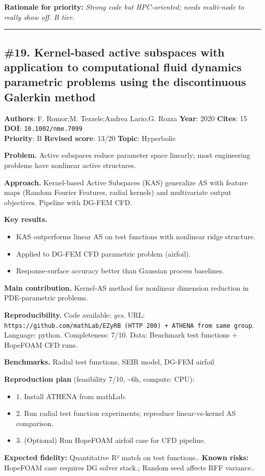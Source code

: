 \documentclass[10pt,letterpaper]{article}
\begin{document}
\textbf{Rationale for priority:} \emph{Strong code but HPC-oriented; needs multi-node to really show off. B tier.}

\medskip\hrule\medskip

\subsection*{\#19. Kernel‐based active subspaces with application to computational fluid dynamics parametric problems using the discontinuous Galerkin method}
\textbf{Authors}: F. Romor;M. Tezzele;Andrea Lario;G. Rozza \textbullet{} \textbf{Year}: 2020 \textbullet{} \textbf{Cites}: 15 \textbullet{} \textbf{DOI}: \texttt{10.1002/nme.7099} \\
\textbf{Priority}: B \textbullet{} \textbf{Revised score}: 13/20 \textbullet{} \textbf{Topic}: Hyperbolic

\textbf{Problem.} Active subspaces reduce parameter space linearly; most engineering problems have nonlinear active structures.

\textbf{Approach.} Kernel-based Active Subspaces (KAS) generalize AS with feature maps (Random Fourier Features, radial kernels) and multivariate output objectives. Pipeline with DG-FEM CFD.

\textbf{Key results.}
\begin{itemize}
\item KAS outperforms linear AS on test functions with nonlinear ridge structure.
\item Applied to DG-FEM CFD parametric problem (airfoil).
\item Response-surface accuracy better than Gaussian process baselines.
\end{itemize}

\textbf{Main contribution.} Kernel-AS method for nonlinear dimension reduction in PDE-parametric problems.

\textbf{Reproducibility.} Code available: \emph{yes}. URL: \texttt{https://github.com/mathLab/EZyRB (HTTP 200) + ATHENA from same group}. Language: python. Completeness: 7/10. Data: Benchmark test functions + HopeFOAM CFD runs.

\textbf{Benchmarks.} Radial test functions, SEIR model, DG-FEM airfoil

\textbf{Reproduction plan} (feasibility 7/10, \textasciitilde6h, compute: CPU):
\begin{itemize}
\item 1. Install ATHENA from mathLab.
\item 2. Run radial test function experiments; reproduce linear-vs-kernel AS comparison.
\item 3. (Optional) Run HopeFOAM airfoil case for CFD pipeline.
\end{itemize}
\textbf{Expected fidelity:} Quantitative R² match on test functions.. \textbf{Known risks:} HopeFOAM case requires DG solver stack.; Random seed affects RFF variance..
\end{document}
